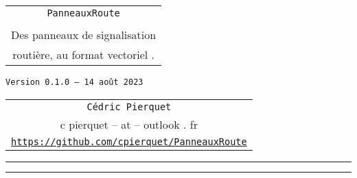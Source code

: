 \documentclass[french,11pt,a4paper]{article}
\def\TPversion{0.1.0}
\def\TPdate{14 août 2023}
\begin{document}
\pagestyle{fancy}

\thispagestyle{empty}

\begin{center}
	\begin{minipage}{0.75\linewidth}
	\begin{tcolorbox}[colframe=yellow,colback=yellow!15]
		\begin{center}
			\begin{tabular}{c}
				{\Huge \texttt{PanneauxRoute}}\\
				\\
				{\LARGE Des panneaux de signalisation} \\
				{\LARGE routière, au format vectoriel .} \\
			\end{tabular}
			
			\medskip
			
			{\small \texttt{Version \TPversion{} -- \TPdate}}
		\end{center}
	\end{tcolorbox}
\end{minipage}
\end{center}

\begin{center}
	\begin{tabular}{c}
	\texttt{Cédric Pierquet}\\
	{\ttfamily c pierquet -- at -- outlook . fr}\\
	\texttt{\url{https://github.com/cpierquet/PanneauxRoute}}
\end{tabular}
\end{center}

\hrule


\hypertarget{matoc}{}

\tableofcontents

\vspace*{5mm}

\hrule

\vspace*{5mm}

\vfill

\hfill
\prPassNivVap[height=4cm]~~~~
\hfill~

\medskip

\hfill
\prDebAutor[scale=0.25]
\hfill~

\vfill~

\pagebreak
\end{document}
